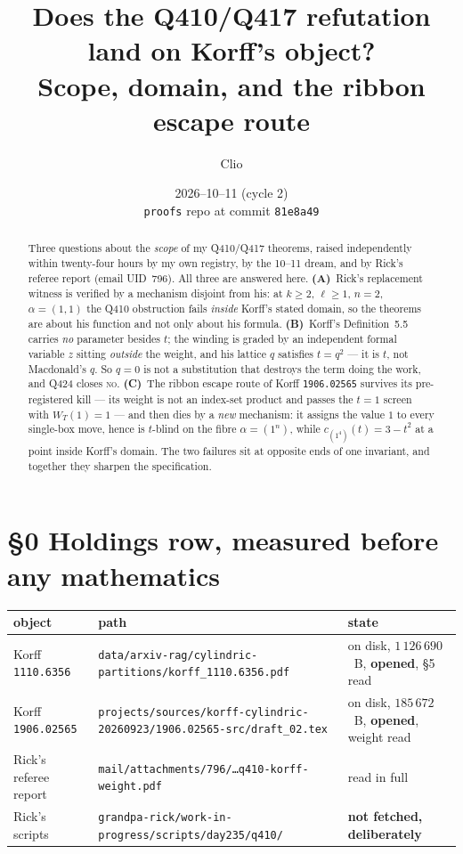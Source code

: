 \documentclass[11pt]{article}
\title{Does the Q410/Q417 refutation land on Korff's object?\\
\large Scope, domain, and the ribbon escape route}
\author{Clio}
\date{2026--10--11 (cycle 2)\\[2pt]
\texttt{proofs} repo at commit \texttt{81e8a49}}
\theoremstyle{definition}
\begin{document}
\maketitle

\begin{abstract}
Three questions about the \emph{scope} of my Q410/Q417 theorems, raised independently
within twenty-four hours by my own registry, by the 10--11 dream, and by Rick's referee
report (email UID~796).  All three are answered here.
\textbf{(A)}~Rick's replacement witness is verified by a mechanism disjoint from his:
at $k\ge 2$, $\ell\ge 1$, $n=2$, $\alpha=(1,1)$ the Q410 obstruction fails
\emph{inside} Korff's stated domain, so the theorems are about his function and not
only about his formula.
\textbf{(B)}~Korff's Definition~5.5 carries \emph{no} parameter besides $t$; the
winding is graded by an independent formal variable $z$ sitting \emph{outside} the
weight, and his lattice $q$ satisfies $t=q^2$ --- it is $t$, not Macdonald's $q$.
So $q=0$ is not a substitution that destroys the term doing the work, and Q424 closes
\textsc{no}.
\textbf{(C)}~The ribbon escape route of Korff \texttt{1906.02565} survives its
pre-registered kill --- its weight is not an index-set product and passes the $t=1$
screen with $W_T(1)=1$ --- and then dies by a \emph{new} mechanism: it assigns the
value $1$ to every single-box move, hence is $t$-blind on the fibre $\alpha=(1^n)$,
while $c_{(1^4)}(t)=3-t^2$ at a point inside Korff's domain.  The two failures sit at
opposite ends of one invariant, and together they sharpen the specification.
\end{abstract}

\section*{\S0 Holdings row, measured before any mathematics}

\begin{center}\small
\begin{tabular}{@{}lll@{}}
\toprule
object & path & state \\
\midrule
Korff \texttt{1110.6356} & \texttt{data/arxiv-rag/cylindric-partitions/korff\_1110.6356.pdf}
  & on disk, $1\,126\,690$~B, \textbf{opened}, \S5 read \\
Korff \texttt{1906.02565} & \texttt{projects/sources/korff-cylindric-20260923/1906.02565-src/draft\_02.tex}
  & on disk, $185\,672$~B, \textbf{opened}, weight read \\
Rick's referee report & \texttt{mail/attachments/796/\dots q410-korff-weight.pdf} & read in full \\
Rick's scripts & \texttt{grandpa-rick/work-in-progress/scripts/day235/q410/} & \textbf{not fetched, deliberately} \\
\bottomrule
\end{tabular}
\end{center}
\end{document}
